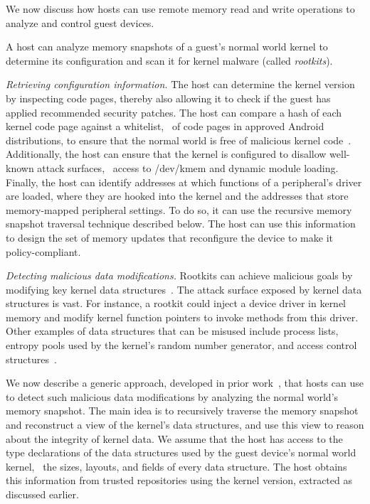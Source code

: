 \label{section:policy}

We now discuss how hosts can use remote memory read and write operations to
analyze and control guest devices.

%
A host can analyze memory snapshots of a guest's normal world kernel
to determine its configuration and scan it for kernel malware 
(called \textit{rootkits}).

\begin{mylist}
%
\item \textit{Retrieving configuration information.} The host can determine the
kernel version by inspecting code pages, thereby also allowing it to check if
the guest has applied recommended security patches. The host can compare a hash
of each kernel code page against a whitelist, \eg~of code pages in approved
Android distributions, to ensure that the normal world is free of malicious
kernel code~\cite{patagonix:sec08,secvisor:sosp07}. Additionally, the host can
ensure that the kernel is configured to disallow well-known attack surfaces,
\eg~access to \textsf{/dev/kmem} and dynamic module loading. Finally, the host
can identify addresses at which functions of a peripheral's driver are loaded,
where they are hooked into the kernel and the addresses that store
memory-mapped peripheral settings. To do so, it can use the recursive memory
snapshot traversal technique described below. The host can use this information
to design the set of memory updates that reconfigure the device to make it
policy-compliant.
%
\item \textit{Detecting malicious data modifications.} Rootkits can
achieve malicious goals by modifying key kernel data
structures~\cite{sbcfi:ccs07,shadows:oakland07,specmon:usenix06}.  The attack
surface exposed by kernel data structures is vast.  For instance, a rootkit could
inject a device driver in kernel memory and modify kernel function pointers to
invoke methods from this driver.  Other examples of data structures that can be
misused include process lists, entropy pools used by the kernel's random number
generator, and access control
structures~\cite{shadows:oakland07,specmon:usenix06}.  
%
\end{mylist}

We now describe a generic approach, developed in prior
work~\cite{sbcfi:ccs07,gib:tdsc11,kop:ccs09,kop:sec12}, that hosts can use to
detect such malicious data modifications by analyzing the normal world's memory
snapshot. The main idea is to recursively traverse the memory snapshot and
reconstruct a view of the kernel's data structures, and use this view to reason
about the integrity of kernel data. We assume that the host has access to the
type declarations of the data structures used by the guest device's normal
world kernel, \eg~the sizes, layouts, and fields of every data structure. The
host obtains this information from trusted repositories using the kernel
version, extracted as discussed earlier.


